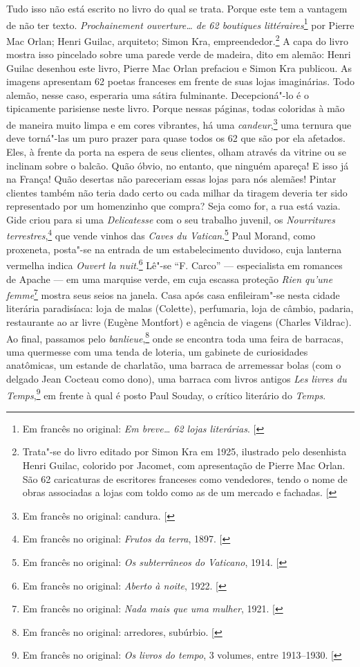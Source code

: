 Tudo isso não está escrito no livro do qual se trata. Porque este tem
a vantagem de não ter texto. \emph{Prochainement ouverture\ldots{} de 62 boutiques littéraires}\footnote{Em francês no original: \emph{Em breve\ldots{} 62 lojas literárias}. {[}\versal{N.~T.}{]}} 
por Pierre Mac Orlan; Henri Guilac, arquiteto; Simon Kra,
empreendedor.\footnote{Trata"-se do
  livro editado por Simon Kra em 1925, ilustrado pelo desenhista Henri
  Guilac, colorido por Jacomet, com apresentação de Pierre Mac Orlan.
  São 62 caricaturas de escritores franceses como vendedores, tendo o
  nome de obras associadas a lojas com toldo como as de um mercado e
  fachadas. {[}\versal{N.~O.}{]}} A capa do livro mostra isso pincelado sobre uma
parede verde de madeira, dito em alemão: Henri Guilac desenhou este
livro, Pierre Mac Orlan prefaciou e Simon Kra publicou. As imagens
apresentam 62 poetas franceses em frente de suas lojas imaginárias. Todo
alemão, nesse caso, esperaria uma sátira fulminante. Decepcioná"-lo é o
tipicamente parisiense neste livro. Porque nessas páginas, todas
coloridas à mão de maneira muito limpa e em cores vibrantes, há uma
\emph{candeur},\footnote{Em francês no original: candura. {[}\versal{N.~T.}{]}}
uma ternura que deve torná"-las um puro prazer para quase todos os 62 que
são por ela afetados. Eles, à frente da porta na espera de seus
clientes, olham através da vitrine ou se inclinam sobre o balcão. Quão
óbvio, no entanto, que ninguém apareça! E isso já na França! Quão
desertas não pareceriam essas lojas para nós alemães! Pintar clientes
também não teria dado certo ou cada milhar da tiragem deveria ter sido
representado por um homenzinho que compra? Seja como for, a rua está
vazia. Gide criou para si uma \emph{Delicatesse} com o seu trabalho
juvenil, os \emph{Nourritures terrestres},\footnote{Em francês no original: \emph{Frutos da
  terra}, 1897. {[}\versal{N.~T.}{]}} que vende vinhos das \emph{Caves
du Vatican}.\footnote{Em francês no original: \emph{Os subterrâneos do Vaticano}, 1914.
  {[}\versal{N.~T.}{]}} Paul Morand, como proxeneta, posta"-se na entrada de um
estabelecimento duvidoso, cuja lanterna vermelha indica \emph{Ouvert la
nuit}.\footnote{Em francês no original: \emph{Aberto à noite}, 1922. {[}\versal{N.~T.}{]}} Lê"-se
``F. Carco'' --- especialista em romances de Apache --- em uma marquise
verde, em cuja escassa proteção \emph{Rien qu'une femme}\footnote{Em francês no original:
\emph{Nada mais que uma mulher}, 1921. {[}\versal{N.~T.}{]}} mostra seus seios na
janela. Casa após casa enfileiram"-se nesta cidade literária paradisíaca:
loja de malas (Colette), perfumaria, loja de câmbio, padaria,
restaurante ao ar livre (Eugène Montfort) e agência de viagens (Charles
Vildrac). Ao final, passamos pelo \emph{banlieue},\footnote{Em francês no original: arredores, subúrbio. {[}\versal{N.~T.}{]}} onde se encontra toda
uma feira de barracas, uma quermesse com uma tenda de loteria, um
gabinete de curiosidades anatômicas, um estande de charlatão, uma
barraca de arremessar bolas (com o delgado Jean Cocteau como dono), uma
barraca com livros antigos \emph{Les livres du Temps},\footnote{Em francês no original:
\emph{Os livros do tempo}, 3 volumes, entre 1913--1930. {[}\versal{N.~T.}{]}} em frente à
qual é posto Paul Souday, o crítico literário do \emph{Temps}.

